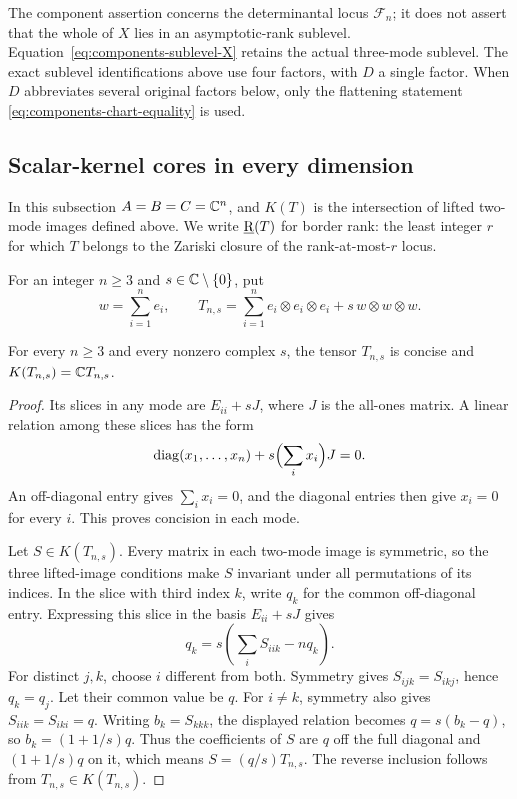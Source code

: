 The component assertion concerns the determinantal locus $\mathcal F_n$;
it does not assert that the whole of $X$ lies in an asymptotic-rank
sublevel. Equation~\eqref{eq:components-sublevel-X} retains the actual
three-mode sublevel. The exact sublevel identifications above use four
factors, with $D$ a single factor. When $D$ abbreviates several original
factors below, only the flattening statement
\eqref{eq:components-chart-equality} is used.

\subsection{Scalar-kernel cores in every dimension}
\label{sec:general-cores}

In this subsection $A=B=C=\mathbb C^n$, and $K(T)$ is the intersection
of lifted two-mode images defined above. We write $\underline{\mathrm R}(T)$
for border rank: the least integer $r$ for which $T$ belongs to the
Zariski closure of the rank-at-most-$r$ locus.

For an integer $n\geq3$ and $s\in\mathbb C\setminus\{0\}$, put
\begin{equation}\label{eq:general-core}
 w=\sum_{i=1}^n e_i,
 \qquad T_{n,s}=\sum_{i=1}^n e_i\otimes e_i\otimes e_i
                    +s\,w\otimes w\otimes w.
\end{equation}

\begin{lemma}\label{lem:general-core}
For every $n\geq3$ and every nonzero complex $s$, the tensor
$T_{n,s}$ is concise and $K(T_{n,s})=\mathbb C T_{n,s}$.
\end{lemma}

\begin{proof}
Its slices in any mode are $E_{ii}+sJ$, where $J$ is the all-ones
matrix. A linear relation among these slices has the form
\[
 \operatorname{diag}(x_1,\ldots,x_n)
                      +s\Bigl(\sum_i x_i\Bigr)J=0.
\]
An off-diagonal entry gives $\sum_i x_i=0$, and the diagonal entries
then give $x_i=0$ for every $i$. This proves concision in each mode.

Let $S\in K(T_{n,s})$. Every matrix in each two-mode image is
symmetric, so the three lifted-image conditions make $S$ invariant
under all permutations of its indices. In the slice with third
index $k$, write $q_k$ for the common off-diagonal entry. Expressing
this slice in the basis $E_{ii}+sJ$ gives
\[
 q_k=s\left(\sum_i S_{iik}-nq_k\right).
\]
For distinct $j,k$, choose $i$ different from both. Symmetry gives
$S_{ijk}=S_{ikj}$, hence $q_k=q_j$. Let their common value be $q$.
For $i\ne k$, symmetry also gives $S_{iik}=S_{iki}=q$.
Writing $b_k=S_{kkk}$, the displayed relation becomes
$q=s(b_k-q)$, so $b_k=(1+1/s)q$. Thus the coefficients of $S$ are
$q$ off the full diagonal and $(1+1/s)q$ on it, which means
$S=(q/s)T_{n,s}$. The reverse inclusion follows from
$T_{n,s}\in K(T_{n,s})$.
\end{proof}

